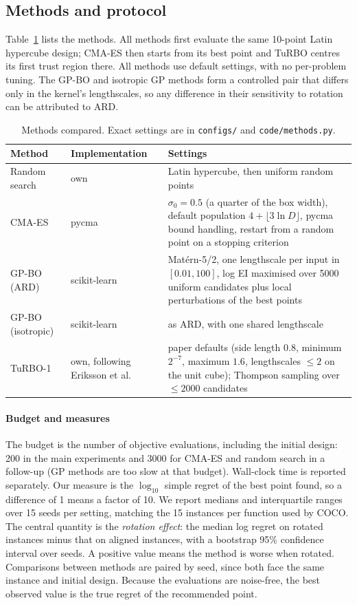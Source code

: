 \documentclass[12pt]{article}
\begin{document}
\subsection{Methods and protocol}
Table~\ref{tab:methods} lists the methods. All methods first evaluate the same 10-point Latin
hypercube design; CMA-ES then starts from its best point and TuRBO centres its first trust region
there. All methods use default settings, with no per-problem tuning. The GP-BO and isotropic GP
methods form a controlled pair that differs only in the kernel's lengthscales, so any difference in
their sensitivity to rotation can be attributed to ARD.

\begin{table}[h]
\centering\small
\begin{tabular}{p{2.5cm}p{3.6cm}p{9.2cm}}
\toprule
Method & Implementation & Settings \\
\midrule
Random search & own & Latin hypercube, then uniform random points \\
CMA-ES & pycma \cite{hansen2019pycma} & $\sigma_0=0.5$ (a quarter of the box width), default population $4+\lfloor 3\ln D\rfloor$, pycma bound handling, restart from a random point on a stopping criterion \\
GP-BO (ARD) & scikit-learn \cite{pedregosa2011sklearn} & Mat\'ern-5/2, one lengthscale per input in $[0.01,100]$, log EI maximised over 5000 uniform candidates plus local perturbations of the best points \\
GP-BO (isotropic) & scikit-learn & as ARD, with one shared lengthscale \\
TuRBO-1 & own, following Eriksson et al.~\cite{eriksson2019turbo} & paper defaults (side length $0.8$, minimum $2^{-7}$, maximum $1.6$, lengthscales $\le 2$ on the unit cube); Thompson sampling over $\le 2000$ candidates \\
\bottomrule
\end{tabular}
\caption{Methods compared. Exact settings are in \texttt{configs/} and \texttt{code/methods.py}.}
\label{tab:methods}
\end{table}

\paragraph{Budget and measures}
The budget is the number of objective evaluations, including the
initial design: 200 in the main experiments and 3000 for CMA-ES and random search in a follow-up
(GP methods are too slow at that budget). Wall-clock time is reported separately. Our measure is the
$\log_{10}$ simple regret of the best point found, so a difference of 1 means a factor of 10. We report
medians and interquartile ranges over 15 seeds per setting, matching the 15 instances per function used
by COCO. The central quantity is the \emph{rotation effect}: the median log regret on rotated instances
minus that on aligned instances, with a bootstrap 95\% confidence interval over seeds. A positive value
means the method is worse when rotated. Comparisons between methods are paired by seed, since both
face the same instance and initial design. Because the evaluations are noise-free, the best observed
value is the true regret of the recommended point.
\end{document}
